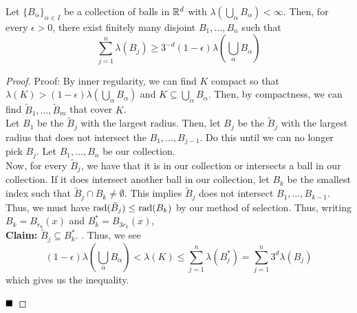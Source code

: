 \begin{lemma}
    Let $\{B_{\alpha}\}_{\alpha \in I}$ be a collection of balls in $\R^d$ with $\lambda\left(\bigcup_{\alpha} B_{\alpha}\right) < \infty$. Then, for every $\epsilon > 0$, there exist finitely many disjoint $B_1, \ldots, B_n$ such that
    \[ \sum_{j = 1}^{n} \lambda(B_j) \geq 3^{-d}(1 - \epsilon)\lambda\left(\bigcup_{\alpha} B_{\alpha}\right) \]
\end{lemma}
\begin{proof}{Proof:}
    By inner regularity, we can find $K$ compact so that $\lambda(K) > (1 - \epsilon)\lambda\left(\bigcup_{\alpha} B_{\alpha}\right)$ and $K \subseteq \bigcup_{\alpha} B_{\alpha}$. Then, by compactness, we can find $\tilde{B}_1, \ldots, \tilde{B}_m$ that cover $K$.\\

    Let $B_1$ be the $\tilde{B}_j$ with the largest radius. Then, let $B_j$ be the $\tilde{B}_j$ with the largest radius that does not intersect the $B_1, \ldots, B_{j - 1}$. Do this until we can no longer pick $B_j$. Let $B_1, \ldots, B_n$ be our collection.\\

    Now, for every $\tilde{B}_j$, we have that it is in our collection or intersects a ball in our collection. If it does intersect another ball in our collection, let $B_k$ be the smallest index such that $\tilde{B}_j \cap B_k \neq \emptyset$. This implies $\tilde{B}_j$ does not intersect $B_1, \ldots, B_{k - 1}$.\\

    Thus, we must have $\tt{rad}(\tilde{B}_j) \leq \tt{rad}(B_k)$ by our method of selection. Thus, writing $B_k = B_{r_k}(x)$ and $B_k^{*} = B_{3r_k}(x)$,\\

    \textbf{Claim:} $\tilde{B}_j \subseteq B_k^{*}$.
.
    Thus, we see
    \[ (1 - \epsilon)\lambda\left(\bigcup_{\alpha} B_{\alpha}\right) < \lambda(K) \leq \sum_{j = 1}^{n} \lambda(B_j^{*}) = \sum_{j = 1}^{n} 3^d\lambda(B_j) \]
    which gives us the inequality.

    $\qed$
\end{proof}

